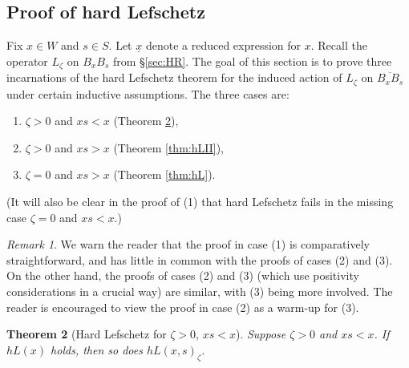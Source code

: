 \documentclass[11pt]{amsart}
\numberwithin{equation}{section}
\def\z{\zeta}
\def\un{\underline}
\newtheorem{thm}{Theorem}[section]
\theoremstyle{definition}
\theoremstyle{remark}
\newtheorem{remark}[thm]{Remark}
\begin{document}
{\subsection{Proof of hard Lefschetz}
Fix $x \in W$ and $s \in S$. Let $\un{x}$
denote a reduced expression for $x$. Recall the operator $L_\z$ on
$B_xB_s$ from \S\ref{sec:HR}. The goal of this section is to prove
three incarnations of the hard Lefschetz theorem for the induced
action of $L_\z$ on $\overline{B_xB_s}$ under certain inductive
  assumptions. The three cases are:
  \begin{enumerate}
  \item $\z > 0$ and $xs < x$ (Theorem \ref{thm:hLI}),
  \item $\z > 0$ and $xs > x$  (Theorem \ref{thm:hLII}),
  \item $\z = 0$ and $xs > x$  (Theorem \ref{thm:hL}).
  \end{enumerate}
(It will also be clear in the proof of (1) that hard Lefschetz fails
in the missing case $\z = 0$ and $xs < x$.)

\begin{remark}
We warn the reader that
the proof in case (1) is comparatively straightforward, and has little in common
with the proofs of cases (2) and (3). On the other hand, the proofs of cases (2) and (3) (which use positivity considerations in
a crucial way) are
similar, with (3) being more involved. The reader is encouraged to view
the proof in case (2) as a warm-up for (3). 
\end{remark}

\begin{thm}[Hard Lefschetz for $\z > 0$, $xs < x$]
\label{thm:hLI} Suppose $\z > 0$ and $xs < x$. If $hL(x)$ holds,
then so does $hL(x,s)_\z$.
\end{thm}

}
\end{document}
